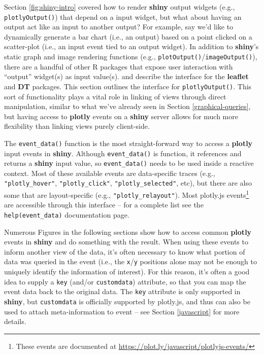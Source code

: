 \documentclass[
  12pt,
]{krantz}
\begin{document}
Section \ref{fig:shiny-intro} covered how to render \textbf{shiny} output widgets (e.g., \texttt{plotlyOutput()}) that depend on a input widget, but what about having an output act like an input to another output? For example, say we'd like to dynamically generate a bar chart (i.e., an output) based on a point clicked on a scatter-plot (i.e., an input event tied to an output widget). In addition to \textbf{shiny}'s static graph and image rendering functions (e.g., \texttt{plotOutput()}/\texttt{imageOutput()}), there are a handful of other R packages that expose user interaction with ``output'' widget(s) as input value(s). \citet{leaflet-shiny} and \citet{DT-shiny} describe the interface for the \textbf{leaflet} and \textbf{DT} packages. This section outlines the interface for \texttt{plotlyOutput()}. This sort of functionality plays a vital role in linking of views through direct manipulation, similar to what we've already seen in Section \ref{graphical-queries}, but having access to \textbf{plotly} events on a \textbf{shiny} server allows for much more flexibility than linking views purely client-side.


The \texttt{event\_data()} function is the most straight-forward way to access a \textbf{plotly} input events in \textbf{shiny}. Although \texttt{event\_data()} is function, it references and returns a \textbf{shiny} input value, so \texttt{event\_data()} needs to be used inside a reactive context. Most of these available events are data-specific traces (e.g., \texttt{"plotly\_hover"}, \texttt{"plotly\_click"}, \texttt{"plotly\_selected"}, etc), but there are also some that are layout-specific (e.g., \texttt{"plotly\_relayout"}). Most plotly.js events\footnote{These events are documented at \url{https://plot.ly/javascript/plotlyjs-events/}} are accessible through this interface -- for a complete list see the \texttt{help(event\_data)} documentation page.

Numerous Figures in the following sections show how to access common \textbf{plotly} events in \textbf{shiny} and do something with the result. When using these events to inform another view of the data, it's often necessary to know what portion of data was queried in the event (i.e., the \texttt{x}/\texttt{y} positions alone may not be enough to uniquely identify the information of interest). For this reason, it's often a good idea to supply a \texttt{key} (and/or \texttt{customdata}) attribute, so that you can map the event data back to the original data. The \texttt{key} attribute is only supported in \textbf{shiny}, but \texttt{customdata} is officially supported by plotly.js, and thus can also be used to attach meta-information to event -- see Section \ref{javascript} for more details.
\end{document}
